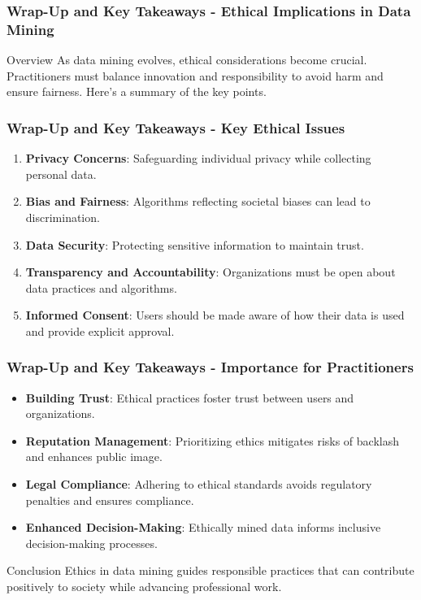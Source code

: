 \documentclass[aspectratio=169]{beamer}
\begin{document}
\begin{frame}[fragile]
    \frametitle{Wrap-Up and Key Takeaways - Ethical Implications in Data Mining}
    \begin{block}{Overview}
        As data mining evolves, ethical considerations become crucial. Practitioners must balance innovation and responsibility to avoid harm and ensure fairness. Here’s a summary of the key points.
    \end{block}
\end{frame}

\begin{frame}[fragile]
    \frametitle{Wrap-Up and Key Takeaways - Key Ethical Issues}
    \begin{enumerate}
        \item \textbf{Privacy Concerns}: Safeguarding individual privacy while collecting personal data.
        \item \textbf{Bias and Fairness}: Algorithms reflecting societal biases can lead to discrimination.
        \item \textbf{Data Security}: Protecting sensitive information to maintain trust.
        \item \textbf{Transparency and Accountability}: Organizations must be open about data practices and algorithms.
        \item \textbf{Informed Consent}: Users should be made aware of how their data is used and provide explicit approval.
    \end{enumerate}
\end{frame}

\begin{frame}[fragile]
    \frametitle{Wrap-Up and Key Takeaways - Importance for Practitioners}
    \begin{itemize}
        \item \textbf{Building Trust}: Ethical practices foster trust between users and organizations.
        \item \textbf{Reputation Management}: Prioritizing ethics mitigates risks of backlash and enhances public image.
        \item \textbf{Legal Compliance}: Adhering to ethical standards avoids regulatory penalties and ensures compliance.
        \item \textbf{Enhanced Decision-Making}: Ethically mined data informs inclusive decision-making processes.
    \end{itemize}
    
    \begin{block}{Conclusion}
        Ethics in data mining guides responsible practices that can contribute positively to society while advancing professional work. 
    \end{block}
\end{frame}
\end{document}
